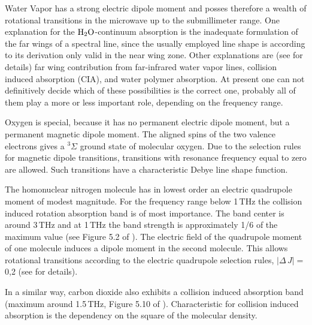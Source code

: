 Water Vapor has a strong electric dipole moment and posses therefore a 
wealth of rotational transitions in the microwave up to the submillimeter 
range. One explanation for the $\mbox{H}_2\mbox{O}$-continuum absorption is the inadequate 
formulation of the far wings of a spectral line, since the usually employed 
\citet{vanvleck:45} line shape is according to its derivation only valid 
in the near wing zone. Other explanations are (see \citet{pwr:93} for details) 
far wing contribution from far-infrared water vapor lines, collision induced 
absorption (CIA), and water polymer absorption. At present one can not definitively 
decide which of these possibilities is the correct one, probably all of them 
play a more or less important role, depending on the frequency range.

Oxygen is special, because it has no permanent electric dipole moment,
but a permanent magnetic dipole moment. The aligned spins of the two
valence electrons gives a $^{3}\Sigma$ ground state of molecular
oxygen.  Due to the selection rules for magnetic dipole transitions,
transitions with resonance frequency equal to zero are allowed. Such
transitions have a characteristic Debye line shape function.

The homonuclear nitrogen molecule has in lowest order an electric quadrupole moment 
of modest magnitude.
For the frequency range below 1\,THz the collision induced rotation absorption 
band \citep{goodyandyung:89} is of most importance. The band center is around 3\,THz and 
at 1\,THz the band strength is approximately 1/6 of the maximum value (see 
Figure 5.2 of \citet{goodyandyung:89}). The electric field of the quadrupole 
moment of one molecule induces a dipole moment in the second molecule. This allows 
rotational transitions according to the electric quadrupole selection rules, 
$|\Delta\,J|=$0,2 (see \citet{pwr:93} for details). 

In a similar way, carbon dioxide also exhibits a collision induced
absorption band (maximum around 1.5\,THz, Figure 5.10 of
\citet{goodyandyung:89}). Characteristic for collision induced
absorption is the dependency on the square of the molecular density.



